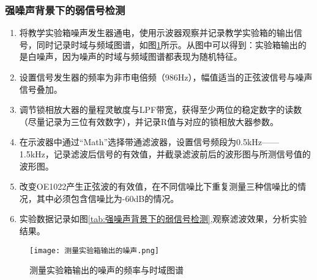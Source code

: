 \documentclass[dvipsnames, svgnames,a4paper,11pt]{article}
\begin{document}
	\subsubsection{强噪声背景下的弱信号检测}
		\begin{enumerate}
			\item 将教学实验箱噪声发生器通电，使用示波器观察并记录教学实验箱的输出信号，同时记录时域与频域图谱，如图\ref{fig:测量实验箱输出的噪声的频率与时域图谱}所示。从图中可以得到：实验箱输出的是白噪声，因为噪声的时域与频域图谱都表现为随机特征。
			\item 设置信号发生器的频率为非市电倍频（986Hz），幅值适当的正弦波信号与噪声信号叠加。
			\item 调节锁相放大器的量程灵敏度与LPF带宽，获得至少两位的稳定数字的读数（尽量记录为三位有效数字），并记录R值与对应的锁相放大器参数。
			\item 在示波器中通过“Math”选择带通滤波器，设置信号频段为0.5kHz——1.5kHz，记录滤波后信号的有效值，并截录滤波前后的波形图与所测信号值的波形图。
			\item 改变OE1022产生正弦波的有效值，在不同信噪比下重复测量三种信噪比的情况，其中必须包含信噪比为-60dB的情况。
			\item 实验数据记录如图\ref{tab:强噪声背景下的弱信号检测},观察滤波效果，分析实验结果。
		\end{enumerate}

		\begin{figure}[htbp]
			\centering
			\texttt{[image: 测量实验箱输出的噪声.png]}
			\caption{测量实验箱输出的噪声的频率与时域图谱}
			\label{fig:测量实验箱输出的噪声的频率与时域图谱}
		\end{figure}
\end{document}
